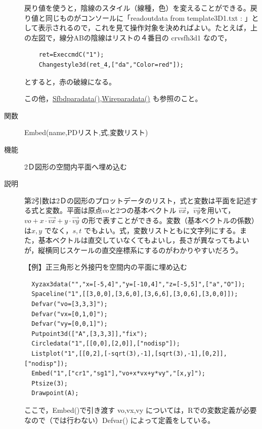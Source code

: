 \documentclass[papersize,a4paper,12pt,uplatex]{jsarticle}
\begin{document}
\begin{description}
戻り値を使うと，陰線のスタイル（線種，色）を変えることができる。戻り値と同じものがコンソールに「readoutdata from template3D1.txt : 」として表示されるので，これを見て操作対象を決めればよい。たとえば，上の左図で，線分ABの陰線はリストの４番目の crvsfh3d1 なので，

\begin{verbatim}
    ret=ExeccmdC("1");
    Changestyle3d(ret_4,["da","Color=red"]);
\end{verbatim}

とすると，赤の破線になる。

\hspace{20mm} 

この他，\hyperlink{sfbdparadata}{Sfbdparadata()},\hyperlink{wireparadata}{Wireparadata()} も参照のこと。

\vspace{\baselineskip}
\hypertarget{embed}{}
\item[関数]  Embed(name,PDリスト,式,変数リスト)
\item[機能]  2Ｄ図形の空間内平面へ埋め込む
\item[説明]  第2引数は2Ｄの図形のプロットデータのリスト，式と変数は平面を記述する式と変数。平面は原点$vo$と2つの基本ベクトル $\overrightarrow{vx}，\overrightarrow{vy}$を用いて，$vo+x \cdot \overrightarrow{vx}+y \cdot \overrightarrow{vy}$ の形で表すことができる。変数（基本ベクトルの係数）は$x,y$ でなく，$s,t$ でもよい。式，変数リストともに文字列にする。また，基本ベクトルは直交していなくてもよいし，長さが異なってもよいが，縦横同じスケールの直交座標系にするのがわかりやすいだろう。

\vspace{\baselineskip}
【例】正三角形と外接円を空間内の平面に埋め込む
\begin{verbatim}
  Xyzax3data("","x=[-5,4]","y=[-10,4]","z=[-5,5]",["a","O"]);
  Spaceline("1",[[3,0,0],[3,6,0],[3,6,6],[3,0,6],[3,0,0]]);
  Defvar("vo=[3,3,3]");
  Defvar("vx=[0,1,0]");
  Defvar("vy=[0,0,1]");
  Putpoint3d(["A",[3,3,3]],"fix");
  Circledata("1",[[0,0],[2,0]],["nodisp"]);
  Listplot("1",[[0,2],[-sqrt(3),-1],[sqrt(3),-1],[0,2]],["nodisp"]);
  Embed("1",["cr1","sg1"],"vo+x*vx+y*vy","[x,y]");
  Ptsize(3);
  Drawpoint(A);
\end{verbatim}
         \begin{center}  \end{center}

ここで，Embed()で引き渡す vo,vx,vy については，Rでの変数定義が必要なので（\ketcindy では行わない）Defvar() によって定義をしている。


\end{description}
\end{document}
